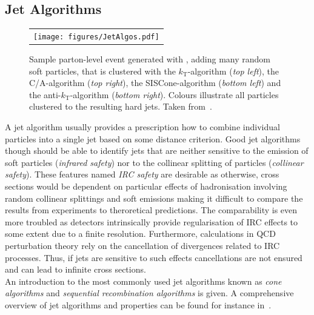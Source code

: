 \subsection{Jet Algorithms}
\label{subsec:jets_algos}
\begin{figure}[!tp]
  \centering 
  \begin{tabular}{c}
    \texttt{[image: figures/JetAlgos.pdf]} 
  \end{tabular}
  \caption{Sample parton-level event generated with \herwig, adding many random soft particles, that is clustered with the $k_\mathrm{T}$-algorithm (\textit{top left}), the C/A-algorithm (\textit{top right}), the SISCone-algorithm (\textit{bottom left}) and the anti-$k_\mathrm{T}$-algorithm (\textit{bottom right}). Colours illustrate all particles clustered to the resulting hard jets. Taken from~\cite{Salam:2009jx}.}
  \label{fig:jet_algos}
\end{figure}
A jet algorithm usually provides a prescription how to combine individual particles into a single jet based on some distance criterion. Good jet algorithms though should be able to identify jets that are neither sensitive to the emission of soft particles (\textit{infrared safety}) nor to the collinear splitting of particles (\textit{collinear safety}). These features named \textit{IRC safety} are desirable as otherwise, \eg cross sections would be dependent on particular effects of hadronisation involving random collinear splittings and soft emissions making it difficult to compare the results from experiments to theroretical predictions. The comparability is even more troubled as detectors intrinsically provide regularisation of IRC effects to some extent due to a finite resolution. Furthermore, calculations in QCD perturbation theory rely on the cancellation of divergences related to IRC processes. Thus, if jets are sensitive to such effects cancellations are not ensured and can lead to infinite cross sections. \\
An introduction to the most commonly used jet algorithms known as \textit{cone algorithms} and \textit{sequential recombination algorithms} is given. A comprehensive overview of jet algorithms and properties can be found for instance in~\cite{Salam:2009jx}.
